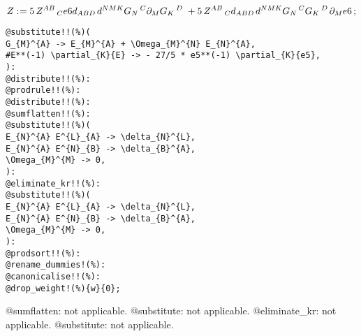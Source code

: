 \documentclass[11pt]{article}
\def\specialcolon{\mathrel{\mathop{:}}\hspace{-.5em}}
\begin{document}
\begin{dmath*}[compact, spread=2pt]
Z\specialcolon{}= 5\, {Z}^{A B}\,_{C} e6 {d}_{A B D\, } {d}^{N M K} {G}_{N}\,^{C} {\partial}_{M}{{G}_{K}\,^{D\, }}\,  + 5\, {Z}^{A B}\,_{C} {d}_{A B D\, } {d}^{N M K} {G}_{N}\,^{C} {G}_{K}\,^{D\, } {\partial}_{M}{e6}\, ;
\end{dmath*}
{\color[named]{Blue}\begin{verbatim}
@substitute!!(%)(
G_{M}^{A} -> E_{M}^{A} + \Omega_{M}^{N} E_{N}^{A},
#E**(-1) \partial_{K}{E} -> - 27/5 * e5**(-1) \partial_{K}{e5},
):
@distribute!!(%):
@prodrule!!(%):
@distribute!!(%):
@sumflatten!!(%):
@substitute!!(%)(
E_{N}^{A} E^{L}_{A} -> \delta_{N}^{L},
E_{N}^{A} E^{N}_{B} -> \delta_{B}^{A},
\Omega_{M}^{M} -> 0,
):
@eliminate_kr!!(%):
@substitute!!(%)(
E_{N}^{A} E^{L}_{A} -> \delta_{N}^{L},
E_{N}^{A} E^{N}_{B} -> \delta_{B}^{A},
\Omega_{M}^{M} -> 0,
):
@prodsort!!(%):
@rename_dummies!(%):
@canonicalise!!(%):
@drop_weight!(%){w}{0};
\end{verbatim}}
@sumflatten: not applicable.
@substitute: not applicable.
@eliminate\_kr: not applicable.
@substitute: not applicable.
\end{document}
